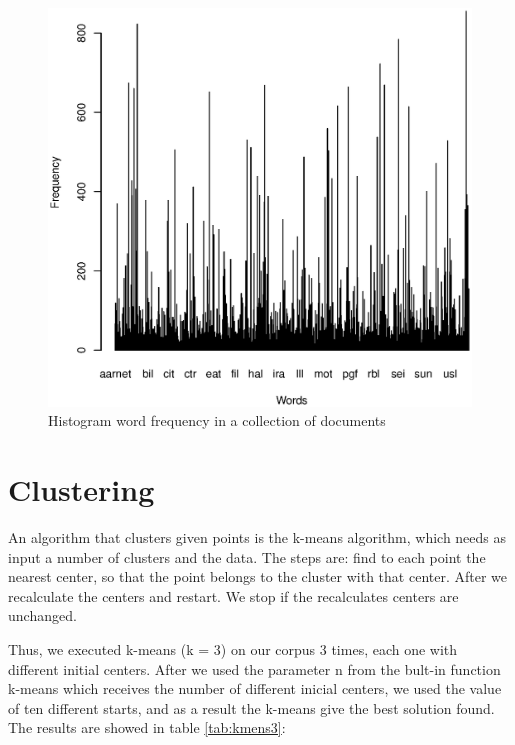 \documentclass[a4paper,11pt]{article}
\begin{document}
\begin{figure}[h!]
  \begin{centering}
    \includegraphics[trim=0 0 0 50,scale=0.5]{../graphs/q1/Histogram}
    \par\end{centering}
  \caption{Histogram word frequency in a collection of documents}
  \label{fig:jacobi-conv}
\end{figure}

\section{Clustering}

An algorithm  that clusters given points  is the k-means  algorithm, which
needs as input  a number of clusters and  the data. The steps are:  find to each
point the  nearest center,  so that the  point belongs  to the cluster  with that
center.  After  we  recalculate  the   centers  and  restart.  We  stop  if  the
recalculates centers are unchanged.

Thus, we executed k-means (k = 3) on our corpus 3 times, each one with different
initial centers. After we used the parameter n from the bult-in function k-means
which receives the number of different inicial centers, we used the value of ten
different starts, and as a result the k-means give the best solution found. The results are showed in table \ref{tab:kmens3}:
\end{document}
